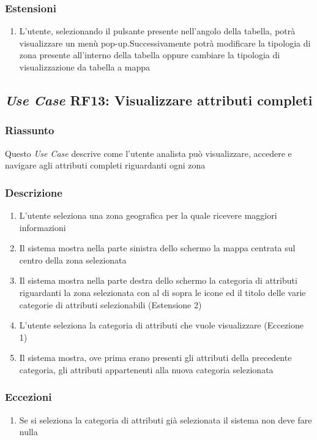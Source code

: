         \subsubsection{Estensioni}
            \begin{enumerate}
                \item L'utente, selezionando il pulsante presente nell'angolo della tabella, potrà visualizzare un menù pop-up.Successivamente potrà modificare la tipologia di zona presente all'interno della tabella oppure cambiare la tipologia di visualizzazione da tabella a mappa
            \end{enumerate}

    \subsection{\textit{Use Case} RF13: Visualizzare attributi completi}
        \subsubsection{Riassunto}
            Questo \textit{Use Case} descrive come l'utente analista può visualizzare, accedere e navigare agli attributi completi riguardanti ogni zona
        \subsubsection{Descrizione}
            \begin{enumerate}
                \item L'utente seleziona una zona geografica per la quale ricevere maggiori informazioni
                \item Il sistema mostra nella parte sinistra dello schermo la mappa centrata sul centro della zona selezionata
                \item Il sistema mostra nella parte destra dello schermo la categoria di attributi riguardanti la zona selezionata con al di sopra le icone ed il titolo delle varie categorie di attributi selezionabili (Estensione 2)
                \item L'utente seleziona la categoria di attributi che vuole visualizzare (Eccezione 1)
                \item Il sistema mostra, ove prima erano presenti gli attributi della precedente categoria, gli attributi appartenenti alla nuova categoria selezionata
            \end{enumerate}
        \subsubsection{Eccezioni}
            \begin{enumerate}
                \item Se si seleziona la categoria di attributi già selezionata il sistema non deve fare nulla
            \end{enumerate}
